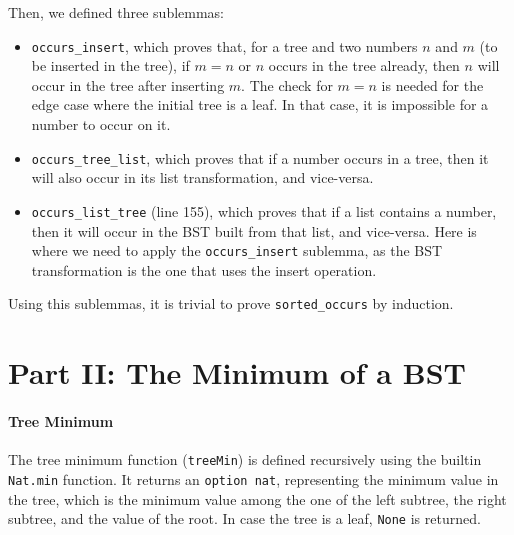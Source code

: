 \documentclass[a4paper]{article}
\begin{document}
Then, we defined three sublemmas:

\begin{itemize}
    \item \texttt{occurs\_insert}, which proves that, for a tree and two numbers $n$ and $m$ (to be inserted in the tree), if $m=n$ or $n$ occurs in the tree already, then $n$ will occur in the tree after inserting $m$. The check for $m=n$ is needed for the edge case where the initial tree is a leaf. In that case, it is impossible for a number to occur on it.
    

    \item \texttt{occurs\_tree\_list}, which proves that if a number occurs in a tree, then it will also occur in its list transformation, and vice-versa.
    
    
    \item \texttt{occurs\_list\_tree} (line 155), which proves that if a list contains a number, then it will occur in the BST built from that list, and vice-versa. Here is where we need to apply the \texttt{occurs\_insert} sublemma, as the BST transformation is the one that uses the insert operation.
    
\end{itemize}

Using this sublemmas, it is trivial to prove \texttt{sorted\_occurs} by induction.



\section{Part II: The Minimum of a BST}

\paragraph{Tree Minimum} The tree minimum function (\texttt{treeMin}) is defined recursively using the builtin \texttt{Nat.min} function. It returns an \texttt{option nat}, representing the minimum value in the tree, which is the minimum value among the one of the left subtree, the right subtree, and the value of the root. In case the tree is a leaf, \texttt{None} is returned.


\end{document}
